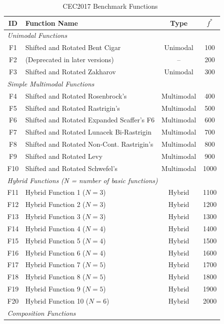 \documentclass[11pt]{article}
\begin{document}
\begin{table}[htbp]
\centering
\caption{CEC2017 Benchmark Functions~\cite{awad2016cec2017}}
\label{tab:cec2017functions}
\begin{tabular}{@{}clcc@{}}
\toprule
\textbf{ID} & \textbf{Function Name} & \textbf{Type} & $f^*$ \\
\midrule
\multicolumn{4}{l}{\textit{Unimodal Functions}} \\
F1 & Shifted and Rotated Bent Cigar & Unimodal & 100 \\
F2 & (Deprecated in later versions) & -- & 200 \\
F3 & Shifted and Rotated Zakharov & Unimodal & 300 \\
\midrule
\multicolumn{4}{l}{\textit{Simple Multimodal Functions}} \\
F4 & Shifted and Rotated Rosenbrock's & Multimodal & 400 \\
F5 & Shifted and Rotated Rastrigin's & Multimodal & 500 \\
F6 & Shifted and Rotated Expanded Scaffer's F6 & Multimodal & 600 \\
F7 & Shifted and Rotated Lunacek Bi-Rastrigin & Multimodal & 700 \\
F8 & Shifted and Rotated Non-Cont. Rastrigin's & Multimodal & 800 \\
F9 & Shifted and Rotated Levy & Multimodal & 900 \\
F10 & Shifted and Rotated Schwefel's & Multimodal & 1000 \\
\midrule
\multicolumn{4}{l}{\textit{Hybrid Functions (N = number of basic functions)}} \\
F11 & Hybrid Function 1 ($N=3$) & Hybrid & 1100 \\
F12 & Hybrid Function 2 ($N=3$) & Hybrid & 1200 \\
F13 & Hybrid Function 3 ($N=3$) & Hybrid & 1300 \\
F14 & Hybrid Function 4 ($N=4$) & Hybrid & 1400 \\
F15 & Hybrid Function 5 ($N=4$) & Hybrid & 1500 \\
F16 & Hybrid Function 6 ($N=4$) & Hybrid & 1600 \\
F17 & Hybrid Function 7 ($N=5$) & Hybrid & 1700 \\
F18 & Hybrid Function 8 ($N=5$) & Hybrid & 1800 \\
F19 & Hybrid Function 9 ($N=5$) & Hybrid & 1900 \\
F20 & Hybrid Function 10 ($N=6$) & Hybrid & 2000 \\
\midrule
\multicolumn{4}{l}{\textit{Composition Functions}} \\

\end{tabular}
\end{table}
\end{document}
